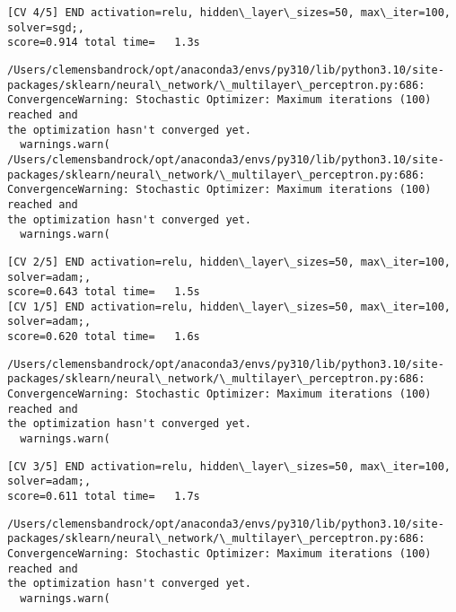 \documentclass[11pt]{article}
\begin{document}
    \begin{Verbatim}[commandchars=\\\{\}]
[CV 4/5] END activation=relu, hidden\_layer\_sizes=50, max\_iter=100, solver=sgd;,
score=0.914 total time=   1.3s
    \end{Verbatim}

    \begin{Verbatim}[commandchars=\\\{\}]
/Users/clemensbandrock/opt/anaconda3/envs/py310/lib/python3.10/site-
packages/sklearn/neural\_network/\_multilayer\_perceptron.py:686:
ConvergenceWarning: Stochastic Optimizer: Maximum iterations (100) reached and
the optimization hasn't converged yet.
  warnings.warn(
/Users/clemensbandrock/opt/anaconda3/envs/py310/lib/python3.10/site-
packages/sklearn/neural\_network/\_multilayer\_perceptron.py:686:
ConvergenceWarning: Stochastic Optimizer: Maximum iterations (100) reached and
the optimization hasn't converged yet.
  warnings.warn(
    \end{Verbatim}

    \begin{Verbatim}[commandchars=\\\{\}]
[CV 2/5] END activation=relu, hidden\_layer\_sizes=50, max\_iter=100, solver=adam;,
score=0.643 total time=   1.5s
[CV 1/5] END activation=relu, hidden\_layer\_sizes=50, max\_iter=100, solver=adam;,
score=0.620 total time=   1.6s
    \end{Verbatim}

    \begin{Verbatim}[commandchars=\\\{\}]
/Users/clemensbandrock/opt/anaconda3/envs/py310/lib/python3.10/site-
packages/sklearn/neural\_network/\_multilayer\_perceptron.py:686:
ConvergenceWarning: Stochastic Optimizer: Maximum iterations (100) reached and
the optimization hasn't converged yet.
  warnings.warn(
    \end{Verbatim}

    \begin{Verbatim}[commandchars=\\\{\}]
[CV 3/5] END activation=relu, hidden\_layer\_sizes=50, max\_iter=100, solver=adam;,
score=0.611 total time=   1.7s
    \end{Verbatim}

    \begin{Verbatim}[commandchars=\\\{\}]
/Users/clemensbandrock/opt/anaconda3/envs/py310/lib/python3.10/site-
packages/sklearn/neural\_network/\_multilayer\_perceptron.py:686:
ConvergenceWarning: Stochastic Optimizer: Maximum iterations (100) reached and
the optimization hasn't converged yet.
  warnings.warn(
    \end{Verbatim}
\end{document}

